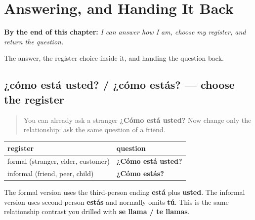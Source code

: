 
\chapter{Answering, and Handing It Back}
\label{ch:answering}

\begin{chapteropening}
\textbf{By the end of this chapter:} \emph{I can answer how I am, choose my register, and return the question.}

The answer, the register choice inside it, and handing the question back.
\end{chapteropening}

\section[¿cómo está usted? / ¿cómo estás?]{¿cómo está usted? / ¿cómo estás? — choose the register}

\label{lesson:ES-C04-como-estas-register}



\begin{quote}
You can already ask a stranger \textbf{¿Cómo está usted?} Now change only the relationship: ask the same question of a friend.
\end{quote}

\begin{grammarlens}[title={Grammar Lens: one question, two relationships}]
\noindent
\begin{tabularx}{\linewidth}{@{}>{\raggedright\arraybackslash}X>{\raggedright\arraybackslash}X@{}}
\toprule
\textbf{register} & \textbf{question} \\
\midrule
formal (stranger, elder, customer) & \textbf{¿Cómo está usted?} \\
informal (friend, peer, child) & \textbf{¿Cómo estás?} \\
\bottomrule
\end{tabularx}

The formal version uses the third-person ending \textbf{está} plus \textbf{usted}. The informal version uses second-person \textbf{estás} and normally omits \textbf{tú}. This is the same relationship contrast you drilled with \textbf{se llama / te llamas}.
\end{grammarlens}

